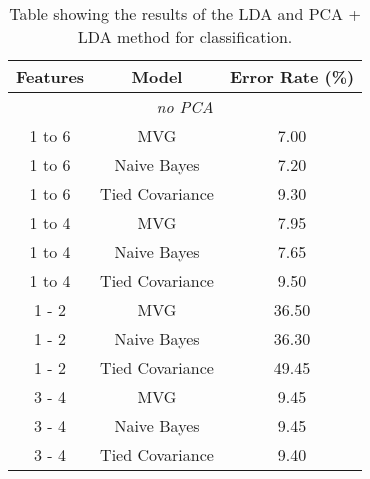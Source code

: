 \begin{table}
    \centering
    \begin{tabular}{c c c}
        \toprule
        \textbf{Features} & \textbf{Model}  & \textbf{Error Rate} (\%) \\
        \midrule
        \multicolumn{3}{c}{\textit{no PCA}} \\
        \midrule
        1 to 6            & MVG             & 7.00                     \\
        1 to 6            & Naive Bayes     & 7.20                     \\
        1 to 6            & Tied Covariance & 9.30                     \\
        \midrule
        1 to 4            & MVG             & 7.95                     \\
        1 to 4            & Naive Bayes     & 7.65                     \\
        1 to 4            & Tied Covariance & 9.50                     \\
        \midrule
        1 - 2             & MVG             & 36.50                    \\
        1 - 2             & Naive Bayes     & 36.30                    \\
        1 - 2             & Tied Covariance & 49.45                    \\
        \midrule
        3 - 4             & MVG             & 9.45                     \\
        3 - 4             & Naive Bayes     & 9.45                     \\
        3 - 4             & Tied Covariance & 9.40                     \\
        \bottomrule
    \end{tabular}
    \captionsetup{justification=justified,singlelinecheck=false,format=hang}
    \caption{Table showing the results of the LDA and PCA + LDA method for classification.}
    \label{tab:resultGaussianClassificationModels}
\end{table}
